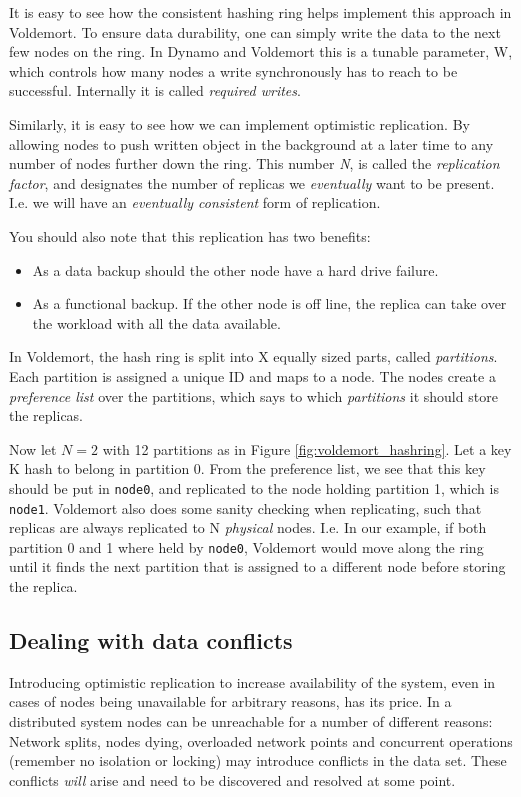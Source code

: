It is easy to see how the consistent hashing ring helps implement this approach in Voldemort.
To ensure data durability, one can simply write the data to the next few nodes on the ring. In Dynamo and Voldemort this is a tunable parameter, W, which controls how many nodes a write synchronously has to reach to be successful. 
Internally it is called \emph{required writes}.

Similarly, it is easy to see how we can implement optimistic replication.
By allowing nodes to push written object in the background at a later time to any number of nodes further down the ring.
This number \emph{N}, is called the \emph{replication factor}, and designates the number of replicas we \emph{eventually} want to be present.
I.e. we will have an \emph{eventually consistent} form of replication.

You should also note that this replication has two benefits: 
\begin{itemize}
	\item As a data backup should the other node have a hard drive failure.
	\item As a functional backup. If the other node is off line, the replica can take over the workload with all the data available.
\end{itemize}

In Voldemort, the hash ring is split into X equally sized parts, called \emph{partitions}. Each partition is assigned a unique ID and maps to a node.
The nodes create a \emph{preference list} over the partitions, which says to which \emph{partitions} it should store the replicas.

Now let $N=2$ with 12 partitions as in Figure \ref{fig:voldemort_hashring}. 
Let a key K hash to belong in partition 0. From the preference list, we see that this key should be put in \texttt{node0}, and replicated to the node holding partition 1, which is \texttt{node1}.
Voldemort also does some sanity checking when replicating, such that replicas are always replicated to N \emph{physical} nodes. 
I.e. In our example, if both partition 0 and 1 where held by \texttt{node0}, Voldemort would move along the ring until it finds the next partition that is assigned to a different node before storing the replica.

\subsection{Dealing with data conflicts}
Introducing optimistic replication to increase availability of the system, even in cases of nodes being unavailable for arbitrary reasons, has its price. 
In a distributed system nodes can be unreachable for a number of different reasons:
Network splits, nodes dying, overloaded network points and concurrent operations (remember no isolation or locking) may introduce conflicts in the data set.
These conflicts \emph{will} arise and need to be discovered and resolved at some point.

